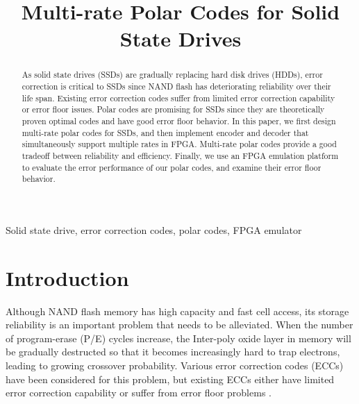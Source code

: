 \documentclass{article}
\title{Multi-rate Polar Codes for Solid State Drives}
\begin{document}
\topmargin=0mm
%
\maketitle

\begin{abstract}
As solid state drives (SSDs) are gradually replacing hard disk drives (HDDs), error correction is critical to SSDs since NAND flash has deteriorating reliability over their life span. Existing error correction codes suffer from limited error correction capability or error floor issues. 
Polar codes are promising for SSDs since they are theoretically proven optimal codes and have good error floor behavior. 
In this paper, we first design multi-rate polar codes for SSDs, and then implement encoder and decoder that simultaneously support multiple rates in FPGA. Multi-rate polar codes provide a good tradeoff between reliability and efficiency. Finally, we use an FPGA emulation platform to evaluate the error performance of our polar codes, and examine their error floor behavior.

\end{abstract}
%
\begin{keywords}
Solid state drive, error correction codes, polar codes, FPGA emulator
\end{keywords}
%
\section{Introduction}
\label{sec:intro}
Although NAND flash memory has high capacity and fast cell access, its storage reliability is an important problem that needs to be alleviated. When the number of program-erase (P/E) cycles increase, the Inter-poly oxide layer in memory will be gradually destructed so that it becomes increasingly hard to trap electrons, leading to growing crossover probability. Various error correction codes (ECCs) have been considered for this problem, but existing ECCs either have limited error correction capability or suffer from error floor problems \cite{Zhao2013LDPC}.
\end{document}
